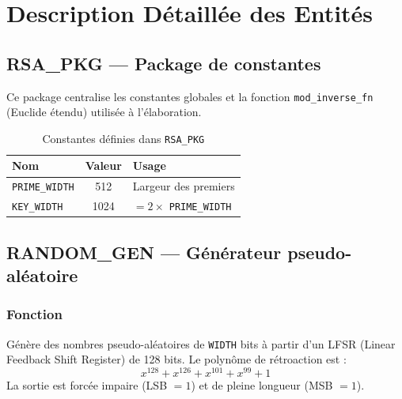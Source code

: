 \section{Description Détaillée des Entités}
\label{ch:entities}

\subsection{RSA\_PKG --- Package de constantes}
\label{sec:pkg}

Ce package centralise les constantes globales et la fonction
\texttt{mod\_inverse\_fn} (Euclide étendu) utilisée à l'élaboration.

\begin{table}[H]
\centering
\caption{Constantes définies dans \texttt{RSA\_PKG}}
\begin{tabular}{lcl}
\toprule
\textbf{Nom} & \textbf{Valeur} & \textbf{Usage} \\
\midrule
\texttt{PRIME\_WIDTH} & 512  & Largeur des premiers \\
\texttt{KEY\_WIDTH}   & 1024 & $= 2 \times$ \texttt{PRIME\_WIDTH} \\
\bottomrule
\end{tabular}
\end{table}

\subsection{RANDOM\_GEN --- Générateur pseudo-aléatoire}
\label{sec:rng}

\subsubsection{Fonction}
Génère des nombres pseudo-aléatoires de \texttt{WIDTH} bits à partir
d'un LFSR (Linear Feedback Shift Register) de 128 bits. Le polynôme
de rétroaction est :
\[
  x^{128} + x^{126} + x^{101} + x^{99} + 1
\]
La sortie est forcée impaire (LSB $= 1$) et de pleine longueur (MSB $= 1$).

